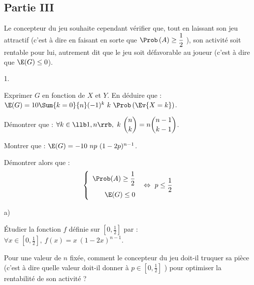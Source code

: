 

\subsection*{Partie III}

\noindent
Le concepteur du jeu souhaite cependant vérifier que, tout en laissant
son jeu attractif (c'est à dire en faisant en sorte que
$\Prob\left(A\right) \geq \dfrac12$ ), son activité soit rentable pour
lui, autrement dit que le jeu soit défavorable au joueur (c'est à dire
que $\E(G) \leq 0$).

\begin{noliste}{1.}
  \setlength{\itemsep}{4mm}
\item Exprimer $G$ en fonction de $X$ et $Y$. En déduire que : $\E(G)
  = 10 \Sum{k = 0}{n} (-1)^{k} \ k \ \Prob\left(\Ev{X = k}\right)$.

  




\item Démontrer que : $\forall k \in \llb 1, n\rrb, \ k \
  \dbinom{n}{k} = n \dbinom{n-1}{k-1}$.

  

\item Montrer que : $\E(G) = -10 \ np \ (1-2p)^{n-1}$.

  




\item Démontrer alors que :
  \[
  \left\{ 
    \begin{array}{r}
      \Prob(A) \geq \dfrac{1}{2} 
      \\[.4cm]
      \E(G) \leq 0
    \end{array}
  \right. \ \Leftrightarrow \ p \leq \dfrac{1}{2}
  \]

  

\item 
  \begin{noliste}{a)} 
    \setlength{\itemsep}{2mm}
  \item Étudier la fonction $f$ définie sur $\left[0, \frac{1}{2}
    \right]$ par : $\forall x \in \left[0, \frac{1}{2} \right], \ f(x)
    = x \ (1-2x)^{n-1}$.

    

  \item Pour une valeur de $n$ fixée, comment le concepteur du jeu
    doit-il truquer sa pièce (c'est à dire quelle valeur doit-il
    donner à $p \in \left[0, \frac{1}{2} \right]$ ) pour optimiser la
    rentabilité de son activité ?

    
  \end{noliste}
\end{noliste}


